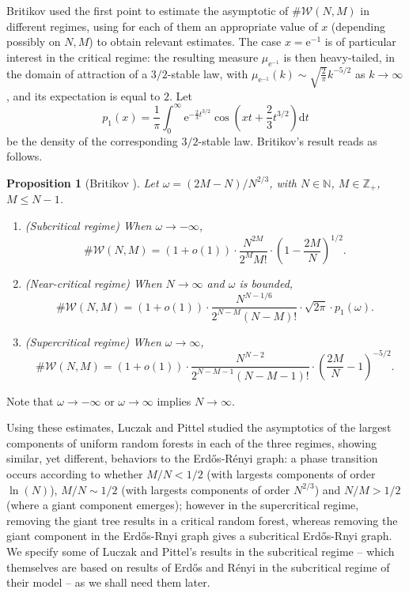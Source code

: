 \documentclass[a4, 11pt]{article}
\numberwithin{equation}{section}
\theoremstyle{plain}
\newtheorem{proposition}[theorem]{Proposition}
\theoremstyle{definition}
\theoremstyle{remark}
\begin{document}
Britikov \cite{britikov88} used the first point to estimate the asymptotic of $\#\mathcal{W}(N,M)$ in different regimes, using for each of them an appropriate value of $x$ (depending possibly on $N,M$) to obtain relevant estimates. The case $x=\mathrm{e}^{-1}$ is of particular interest in the critical regime: the resulting measure $\mu_{\mathrm{e}^{-1}}$ is then heavy-tailed, in the domain of attraction of a $3/2$-stable law, with $\mu_{\mathrm{e}^{-1}}(k)\sim \sqrt{\frac{2}{\pi}}k^{-5/2}$ as $k\to\infty$, and its expectation is equal to $2$. Let 
\begin{equation*}\label{def:p1}
	p_1(x)=\frac{1}{\pi}\int_{0}^{\infty}\mathrm{e}^{-\frac{2}{3}t^{3/2}}\cos\left(xt+\frac{2}{3}t^{3/2}\right)\mathrm{d}t
\end{equation*}
be the density of the corresponding $3/2$-stable law. Britikov's result reads as follows. 

\begin{proposition}[Britikov \cite{britikov88}]
\label{lm:Britikov}
Let $\omega=(2M-N)/N^{2/3}$, with $N \in \mathbb N$, $M \in \mathbb Z_+$, $M\leq N-1$.
\begin{enumerate}[topsep=0cm]
\item[\emph{1)}] \emph{(Subcritical regime)}
When $\omega \to -\infty$,  
$$\#\mathcal{W}(N,M)=\left(1+o(1)\right)\cdot \frac{N^{2M}}{2^M M!} \cdot \left(1-\frac{2M}{N}\right)^{1/2}.$$
\item[\emph{2)}]  \emph{(Near-critical regime)}
When $N \rightarrow \infty$ and $\omega$ is bounded,
$$\#\mathcal{W}(N,M)=\left(1+o(1)\right)\cdot \frac{N^{N-1/6}}{2^{N-M}(N-M)!} \cdot \sqrt{2\pi} \cdot p_1\left(\omega\right).$$ 
\item[\emph{3)}]  \emph{(Supercritical regime)} When $\omega \to \infty$, 
$$ \#\mathcal{W}(N,M)=\left(1+o(1)\right)\cdot  \frac{N^{N-2}}{2^{N-M-1}(N-M-1)!} \cdot \left(\frac{2M}{N}-1\right)^{-5/2}.$$
\end{enumerate}
\end{proposition}

\smallskip

Note that $\omega \to -\infty$ or $\omega \to \infty$ implies $N \rightarrow \infty$.

Using these estimates, Luczak and Pittel \cite{LuczakPittel92}  studied the asymptotics of the largest components of uniform random forests in each of the three regimes, showing similar, yet different, behaviors to the Erd\H{o}s-R\'enyi graph: a phase transition occurs according to whether  $M/N<1/2$ (with largests components of order $\ln(N)$), $M/N \sim 1/2$ (with largests components of order $N^{2/3}$) and $N/M>1/2$ (where a giant component emerges); however in the supercritical regime, removing the giant tree results in a critical random forest, whereas removing the giant component in the Erd\H{o}s-Rnyi graph gives a subcritical Erd\H{o}s-Rnyi graph. We specify some of Luczak and Pittel's results in the subcritical regime -- which themselves are based on results of Erd\H{o}s and R\'enyi \cite{ErdosRenyi60} in the subcritical regime of their model -- as we shall need them later. 
\end{document}
